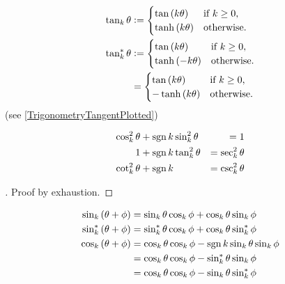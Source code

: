 \documentclass[stu, babel, american, biblatex, a4paper, leqno, draftall]{apa7}
\begin{document}
\begin{example}\label{M:Trigonometry:Tangent}
    \begin{align*}
        \tan_k{\theta} & \vcentcolon=
        \begin{cases}
            \tan\left(k\theta\right)  & \text{if $k\geq0$,} \\
            \tanh\left(k\theta\right) & \text{otherwise.}   \\
        \end{cases} \\
        \tan_k^\ast{\theta} & \vcentcolon=
        \begin{cases}
            \tan\left(k\theta\right)  & \text{if $k\geq0$,} \\
            \tanh\left(-k\theta\right) & \text{otherwise.}   \\
        \end{cases} \\
        & =
        \begin{cases}
            \tan\left(k\theta\right)  & \text{if $k\geq0$,} \\
            -\tanh\left(k\theta\right) & \text{otherwise.}   \\
        \end{cases}
    \end{align*}
    (see \cref{TrigonometryTangentPlotted})
\end{example}
\begin{theorem}\label{M:Trigonometry:Pythagorean}
    \begin{align*}
        \cos_k^2{\theta} & +\operatorname{sgn}{k}\sin_k^2{\theta} & = 1                \\
        1                & +\operatorname{sgn}{k}\tan_k^2{\theta} & = \sec_k^2{\theta} \\
        \cot_k^2{\theta} & +\operatorname{sgn}{k}                 & = \csc_k^2{\theta}
    \end{align*}
\end{theorem}
\begin{proof}[]
    Proof by exhaustion.
\end{proof}
\begin{proposition}\label{M:Trigonometry:Sum}
    \begin{align*}
        \sin_k\left(\theta+\phi\right)
        &= \sin_k{\theta}\cos_k{\phi}+\cos_k{\theta}\sin_k{\phi} \\
        \sin_k^\ast\left(\theta+\phi\right)
        &= \sin_k^\ast{\theta}\cos_k{\phi}+\cos_k{\theta}\sin_k^\ast{\phi} \\
        \cos_k\left(\theta+\phi\right)
        &= \cos_k{\theta}\cos_k{\phi}-\operatorname{sgn}{k}\sin_k{\theta}\sin_k{\phi} \\
        &= \cos_k{\theta}\cos_k{\phi}-\sin_k^\ast{\theta}\sin_k{\phi} \\
        &= \cos_k{\theta}\cos_k{\phi}-\sin_k{\theta}\sin_k^\ast{\phi} \\
    \end{align*}
\end{proposition}
\end{document}
